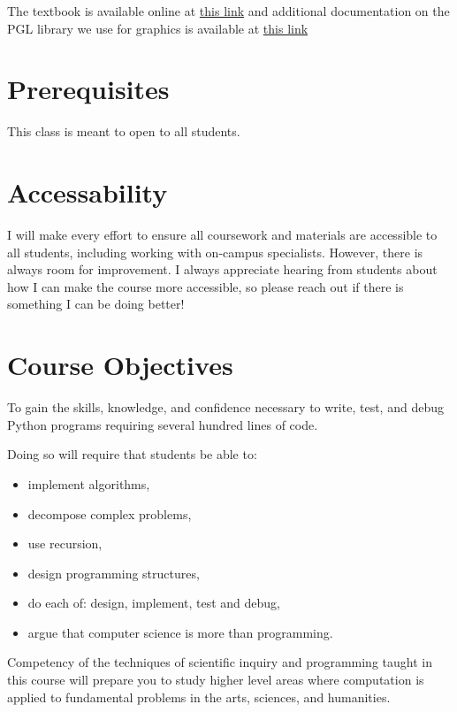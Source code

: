 \documentclass[11pt]{article}
\begin{document}
The textbook is available online at \href{https://willamette.edu/~esroberts/cs151/reader/CS151-Reader.pdf}{this link} and additional documentation on the PGL library we use for graphics is available at \href{https://willamette.edu/~esroberts/python/pgldoc/}{this link}



\section*{Prerequisites}

This class is meant to open to all students.

\section*{Accessability}

I will make every effort to ensure all coursework and materials are accessible to all students, including working with on-campus specialists. However, there is always room for improvement. I always appreciate hearing from students about how I can make the course more accessible, so please reach out if there is something I can be doing better!


\section*{Course Objectives}
To gain the skills, knowledge, and confidence necessary to write, test, and debug Python programs requiring several hundred lines of code.

Doing so will require that students be able to:
\begin{itemize}
\item implement algorithms,
\item decompose complex problems,
\item use recursion, 
\item design programming structures,
\item do each of: design, implement, test and debug,  
\item argue that computer science is more than programming.
\end{itemize}
Competency of the techniques of scientific inquiry and programming taught in this course will prepare you to study higher level areas where computation is applied to fundamental problems in the arts, sciences, and humanities.
\end{document}
